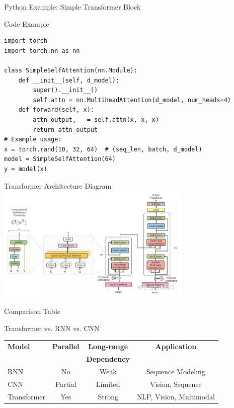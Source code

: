 \documentclass[10pt]{beamer}
\begin{document}
\begin{frame}[fragile]{Python Example: Simple Transformer Block}
  \begin{block}{Code Example}
    \begin{lstlisting}
import torch
import torch.nn as nn

class SimpleSelfAttention(nn.Module):
    def __init__(self, d_model):
        super().__init__()
        self.attn = nn.MultiheadAttention(d_model, num_heads=4)
    def forward(self, x):
        attn_output, _ = self.attn(x, x, x)
        return attn_output
# Example usage:
x = torch.rand(10, 32, 64)  # (seq_len, batch, d_model)
model = SimpleSelfAttention(64)
y = model(x)
    \end{lstlisting}
  \end{block}
\end{frame}

\begin{frame}{Transformer Architecture Diagram}
  \centering
  \includegraphics[width=0.7\textwidth]{illustration/image.png}
\end{frame}

\begin{frame}{Comparison Table}
  \begin{block}{Transformer vs. RNN vs. CNN}
    \renewcommand{\arraystretch}{1.1}
    \begin{tabularx}{0.8\textwidth}{lccc}
      \toprule
      \footnotesize\textbf{Model} & \footnotesize\textbf{Parallel} & \footnotesize\textbf{Long-range} & \footnotesize\textbf{Application} \\
      \footnotesize & \footnotesize & \footnotesize\textbf{Dependency} & \footnotesize \\
      \midrule
      \footnotesize RNN & \footnotesize No & \footnotesize Weak & \footnotesize Sequence Modeling \\
      \footnotesize CNN & \footnotesize Partial & \footnotesize Limited & \footnotesize Vision, Sequence \\
      \footnotesize Transformer & \footnotesize Yes & \footnotesize Strong & \footnotesize NLP, Vision, Multimodal \\
      \bottomrule
    \end{tabularx}
  \end{block}
\end{frame}
\end{document}
